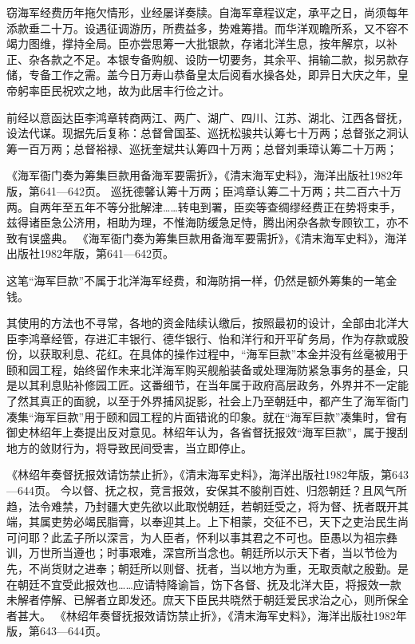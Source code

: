 \documentclass[12pt,UTF8]{ctexbook}
\begin{document}
窃海军经费历年拖欠情形，业经屡详奏牍。自海军章程议定，承平之日，尚须每年添款垂二十万。设遇征调游历，所费益多，势难筹措。而华洋观瞻所系，又不容不竭力图维，撑持全局。臣亦尝思筹一大批银款，存诸北洋生息，按年解京，以补正、杂各款之不足。本银专备购舰、设防一切要务，其余平、捐输二款，拟另款存储，专备工作之需。盖今日万寿山恭备皇太后阅看水操各处，即异日大庆之年，皇帝躬率臣民祝欢之地，故为此居丰行俭之计。

前经以意函达臣李鸿章转商两江、两广、湖广、四川、江苏、湖北、江西各督抚，设法代谋。现据先后复称：总督曾国荃、巡抚松骏共认筹七十万两；总督张之洞认筹一百万两；总督裕禄、巡抚奎斌共认筹四十万两；总督刘秉璋认筹二十万两；

《海军衙门奏为筹集巨款用备海军要需折》，《清末海军史料》，海洋出版社1982年版，第641—642页。
巡抚德馨认筹十万两；臣鸿章认筹二十万两；共二百六十万两。自两年至五年不等分批解津……转电到署，臣奕等查绸缪经费正在势将束手，兹得诸臣急公济用，相助为理，不惟海防缓急足恃，腾出闲杂各款专顾钦工，亦不致有误盛典。 《海军衙门奏为筹集巨款用备海军要需折》，《清末海军史料》，海洋出版社1982年版，第641—642页。

这笔“海军巨款”不属于北洋海军经费，和海防捐一样，仍然是额外筹集的一笔金钱。

其使用的方法也不寻常，各地的资金陆续认缴后，按照最初的设计，全部由北洋大臣李鸿章经管，存进汇丰银行、德华银行、怡和洋行和开平矿务局，作为存款或股份，以获取利息、花红。在具体的操作过程中，“海军巨款”本金并没有丝毫被用于颐和园工程，始终留作未来北洋海军购买舰船装备或处理海防紧急事务的基金，只是以其利息贴补修园工匠。这番细节，在当年属于政府高层政务，外界并不一定能了然其真正的面貌，以至于外界捕风捉影，社会上乃至朝廷中，都产生了海军衙门凑集“海军巨款”用于颐和园工程的片面错讹的印象。就在“海军巨款”凑集时，曾有御史林绍年上奏提出反对意见。林绍年认为，各省督抚报效“海军巨款”，属于搜刮地方的敛财行为，将导致民间受害，当立即停止。

《林绍年奏督抚报效请饬禁止折》，《清末海军史料》，海洋出版社1982年版，第643—644页。
今以督、抚之权，竞言报效，安保其不朘削百姓、归怨朝廷？且风气所趋，法令难禁，乃封疆大吏先欲以此取悦朝廷，若朝廷受之，将为督、抚者既开其端，其属吏势必竭民脂膏，以奉迎其上。上下相蒙，交征不已，天下之吏治民生尚可问耶？此孟子所以深言，为人臣者，怀利以事其君之不可也。臣愚以为祖宗彝训，万世所当遵也；时事艰难，深宫所当念也。朝廷所以示天下者，当以节俭为先，不尚货财之进奉；朝廷所以则督、抚者，当以地方为重，无取贡献之殷勤。是在朝廷不宜受此报效也……应请特降谕旨，饬下各督、抚及北洋大臣，将报效一款未解者停解、已解者立即发还。庶天下臣民共晓然于朝廷爱民求治之心，则所保全者甚大。 《林绍年奏督抚报效请饬禁止折》，《清末海军史料》，海洋出版社1982年版，第643—644页。
\end{document}
